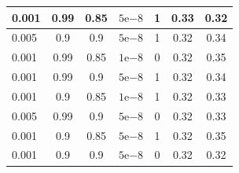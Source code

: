 \begin{table}[]
\begin{tabular}{lcccc|cc|}
\multicolumn{1}{|l|}{0.001}                         & \multicolumn{1}{c|}{0.99}                        & \multicolumn{1}{c|}{0.85}                         & \multicolumn{1}{c|}{$5\mathrm{e}{-8}$}                         & 1       & \multicolumn{1}{c|}{0.33}                         & 0.32    \\ \hline
\multicolumn{1}{|l|}{0.005}                         & \multicolumn{1}{c|}{0.9}                         & \multicolumn{1}{c|}{0.9}                          & \multicolumn{1}{c|}{$5\mathrm{e}{-8}$}                         & 1       & \multicolumn{1}{c|}{0.32}                         & 0.34    \\ \hline
\multicolumn{1}{|l|}{0.001}                         & \multicolumn{1}{c|}{0.99}                        & \multicolumn{1}{c|}{0.85}                         & \multicolumn{1}{c|}{$1\mathrm{e}{-8}$}                         & 0       & \multicolumn{1}{c|}{0.32}                         & 0.35    \\ \hline
\multicolumn{1}{|l|}{0.001}                         & \multicolumn{1}{c|}{0.99}                        & \multicolumn{1}{c|}{0.9}                          & \multicolumn{1}{c|}{$5\mathrm{e}{-8}$}                         & 1       & \multicolumn{1}{c|}{0.32}                         & 0.34    \\ \hline
\multicolumn{1}{|l|}{0.001}                         & \multicolumn{1}{c|}{0.9}                         & \multicolumn{1}{c|}{0.85}                         & \multicolumn{1}{c|}{$1\mathrm{e}{-8}$}                         & 1       & \multicolumn{1}{c|}{0.32}                         & 0.33    \\ \hline
\multicolumn{1}{|l|}{0.005}                         & \multicolumn{1}{c|}{0.99}                        & \multicolumn{1}{c|}{0.9}                          & \multicolumn{1}{c|}{$5\mathrm{e}{-8}$}                         & 0       & \multicolumn{1}{c|}{0.32}                         & 0.33    \\ \hline
\multicolumn{1}{|l|}{0.001}                         & \multicolumn{1}{c|}{0.9}                         & \multicolumn{1}{c|}{0.85}                         & \multicolumn{1}{c|}{$5\mathrm{e}{-8}$}                         & 1       & \multicolumn{1}{c|}{0.32}                         & 0.35    \\ \hline
\multicolumn{1}{|l|}{0.001}                         & \multicolumn{1}{c|}{0.9}                         & \multicolumn{1}{c|}{0.9}                          & \multicolumn{1}{c|}{$5\mathrm{e}{-8}$}                         & 0       & \multicolumn{1}{c|}{0.32}                         & 0.32    \\ \hline

\end{tabular}
\end{table}
